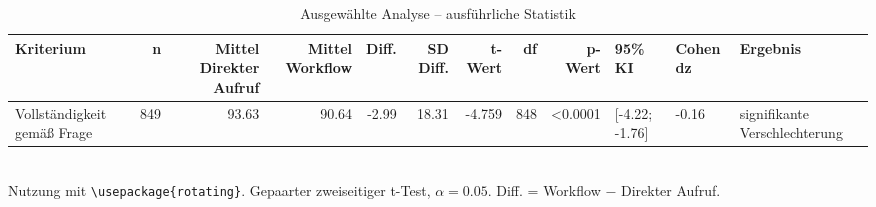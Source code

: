 \begin{table}
\centering
\caption{Ausgewählte Analyse -- ausführliche Statistik}
\begin{tabular}{lrrrrrrrrlll}
\toprule
Kriterium & n & Mittel Direkter Aufruf & Mittel Workflow & Diff. & SD Diff. & t-Wert & df & p-Wert & 95\% KI & Cohen dz & Ergebnis \\
\midrule
Vollständigkeit gemäß Frage & 849 & 93.63 & 90.64 & -2.99 & 18.31 & -4.759 & 848 & <0.0001 & [-4.22; -1.76] & -0.16 & signifikante Verschlechterung \\
\bottomrule
\end{tabular}
\\[2mm]
\footnotesize Nutzung mit \texttt{\textbackslash usepackage\{rotating\}}. Gepaarter zweiseitiger t-Test, $\alpha=0.05$. Diff. = Workflow $-$ Direkter Aufruf.
\end{table}
